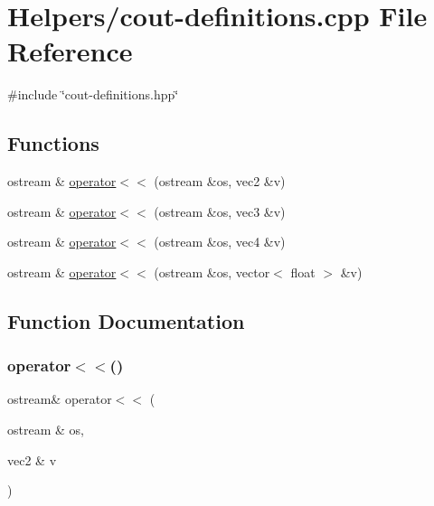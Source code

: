 \hypertarget{cout-definitions_8cpp}{}\section{Helpers/cout-\/definitions.cpp File Reference}
\label{cout-definitions_8cpp}
{\ttfamily \#include \char`\"{}cout-\/definitions.\+hpp\char`\"{}}\newline
\subsection*{Functions}
\begin{DoxyCompactItemize}
\item 
ostream \& \mbox{\hyperlink{cout-definitions_8cpp_a423721485bc58bbd87f25262fc5748b7}{operator$<$$<$}} (ostream \&os, vec2 \&v)
\item 
ostream \& \mbox{\hyperlink{cout-definitions_8cpp_a9785ea3eade9968a62d5e9836f720617}{operator$<$$<$}} (ostream \&os, vec3 \&v)
\item 
ostream \& \mbox{\hyperlink{cout-definitions_8cpp_aced74fdd5c32b973692a20e6272a5f56}{operator$<$$<$}} (ostream \&os, vec4 \&v)
\item 
ostream \& \mbox{\hyperlink{cout-definitions_8cpp_a337249c538c5d8304a68a31ecc936c81}{operator$<$$<$}} (ostream \&os, vector$<$ float $>$ \&v)
\end{DoxyCompactItemize}


\subsection{Function Documentation}
\mbox{\label{cout-definitions_8cpp_a423721485bc58bbd87f25262fc5748b7}} 
\subsubsection{\texorpdfstring{operator$<$$<$()}{operator<<()}\hspace{0.1cm}{\footnotesize\ttfamily [1/4]}}
{\footnotesize\ttfamily ostream\& operator$<$$<$ (\begin{DoxyParamCaption}\item[{ostream \&}]{os,  }\item[{vec2 \&}]{v }\end{DoxyParamCaption})}

